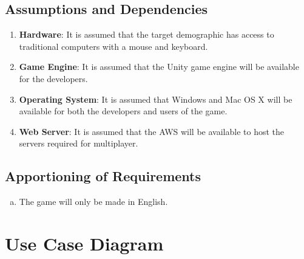\documentclass[]{article}
\begin{document}

\subsection{Assumptions and Dependencies}
\label{sub:assumptions_and_dependencies}
\begin{enumerate}
	\item \textbf{Hardware}: It is assumed that the target demographic has access to traditional computers with a mouse and keyboard.
	\item \textbf{Game Engine}: It is assumed that the Unity game engine will be available for the developers. 
	\item \textbf{Operating System}: It is assumed that Windows and Mac OS X will be available for both the developers and users of the game.
	\item \textbf{Web Server}: It is assumed that the AWS will be available to host the servers required for multiplayer.
	
\end{enumerate}

\subsection{Apportioning of Requirements}
\label{sub:apportioning_of_requirements}
\begin{enumerate}[a)]
	\item The game will only be made in English. %
\end{enumerate}

%
\section{Use Case Diagram}
\label{sec:use_case_diagram}
\end{document}
